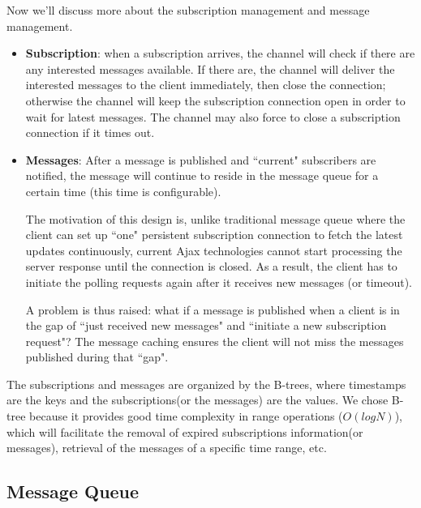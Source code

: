 Now we'll discuss more about the subscription management and message management.
\begin{itemize}
    \item {\bf Subscription}: when a subscription arrives, the channel will
          check if there are any interested messages available. If there are, 
          the channel will deliver the interested messages to the client 
          immediately, then close the connection; otherwise the channel 
          will keep the subscription 
          connection open in order to wait for latest messages. The channel may
          also force to close a subscription connection if it times out. 
    \item {\bf Messages}: After a message is published and 
            ``current" subscribers are notified, the message will continue to 
            reside in the message queue for a certain time (this time is 
            configurable). 
            
            The motivation of this design is, unlike 
            traditional message queue where the client can set up ``one" 
            persistent subscription connection to fetch the latest updates
            continuously, current Ajax technologies cannot start processing
            the server response until the connection is closed. As a result, 
            the client has to initiate the polling requests again after it
            receives new messages (or timeout).

            A problem is thus raised: what if a message is published when a client 
            is in the gap of ``just received new messages" and ``initiate a new subscription
            request"? The message caching ensures 
            the client will not miss the messages published during that ``gap".
\end{itemize}

The subscriptions and messages are organized by the B-trees\cite{BTree}, where
timestamps are the keys and the subscriptions(or the messages) are the values.
We chose B-tree because it provides good time complexity in range operations
($O(log N)$), which will facilitate the removal of expired subscriptions information(or
messages), retrieval of the messages of a specific time range, etc.

\subsection{Message Queue\\}

